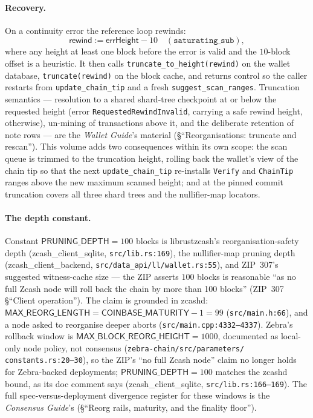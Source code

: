 \documentclass[11pt,a4paper]{article}
\theoremstyle{definition}
\begin{document}
\paragraph{Recovery.} On a continuity error the reference loop rewinds:
\[
\mathsf{rewind} := \mathsf{errHeight} - 10 \quad
(\texttt{saturating\_sub}),
\]
where any height at least one block before the error is valid and the
$10$-block offset is a heuristic. It then calls
\texttt{truncate\_to\_height(rewind)} on the wallet database,
\texttt{truncate(rewind)} on the block cache, and returns control so the
caller restarts from \texttt{update\_chain\_tip} and a fresh
\texttt{suggest\_scan\_ranges}.
Truncation semantics --- resolution to a shared shard-tree checkpoint at
or below the requested height (error \texttt{RequestedRewindInvalid},
carrying a safe rewind height, otherwise), un-mining of transactions
above it, and the deliberate retention of note rows --- are the
\emph{Wallet Guide}'s material (\S``Reorganisations: truncate and
rescan''). This volume adds two consequences within its own scope: the
scan queue is trimmed to the truncation height, rolling back the
wallet's view of the chain tip so that the next
\texttt{update\_chain\_tip} re-installs \texttt{Verify} and
\texttt{ChainTip} ranges above the new maximum scanned height; and at
the pinned commit truncation covers all three shard trees and the
nullifier-map locators.

\paragraph{The depth constant.} Constant $\mathsf{PRUNING\_DEPTH} = 100$
blocks is \textsf{librustzcash}'s reorganisation-safety depth
(\textsf{zcash\_client\_sqlite}, \texttt{src/lib.rs:169}), the nullifier-map
pruning
depth (\textsf{zcash\_client\_\allowbreak backend},
\texttt{src/data\_api/ll/\allowbreak wallet.rs:55}),
and
ZIP~307's suggested witness-cache size --- the ZIP asserts $100$ blocks is
reasonable ``as no full Zcash node will roll back the chain by more than
100 blocks'' (ZIP~307 \S``Client operation''). The claim is grounded in
\textsf{zcashd}: $\mathsf{MAX\_REORG\_LENGTH} =
\mathsf{COINBASE\_MATURITY} - 1 = 99$ (\texttt{src/main.h:66}), and a
node asked to reorganise deeper aborts
(\texttt{src/main.cpp:4332--4337}). \textsf{Zebra}'s rollback window is
$\mathsf{MAX\_BLOCK\_REORG\_HEIGHT} = 1000$, documented as local-only
node policy, not consensus
(\texttt{zebra-chain/src/\allowbreak parameters/\allowbreak
constants.rs:20--30}), so the ZIP's
``no full Zcash node'' claim no longer holds for Zebra-backed
deployments; $\mathsf{PRUNING\_DEPTH} = 100$ matches the zcashd bound,
as its doc comment says (\textsf{zcash\_client\_sqlite},
\texttt{src/lib.rs:166--169}). The full spec-versus-deployment
divergence register for these windows is the \emph{Consensus Guide}'s
(\S``Reorg rails, maturity, and the finality floor'').
\end{document}
